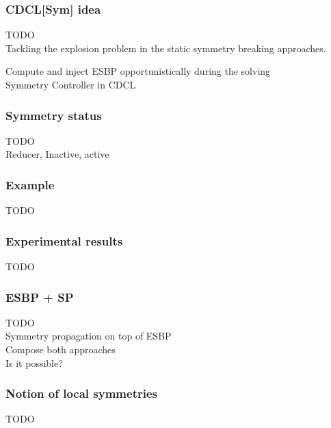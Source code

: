\documentclass{beamer}
\begin{document}
\begin{frame}
\frametitle{CDCL[Sym] idea}
TODO\\

Tackling the explosion problem in the static
symmetry breaking approaches.


Compute and inject ESBP opportunistically during the solving\\


Symmetry Controller in CDCL\\


\end{frame}

\begin{frame}
\frametitle{Symmetry status}
TODO\\

Reducer, Inactive, active\\

\end{frame}

\begin{frame}
\frametitle{Example}
TODO\\

\end{frame}

\begin{frame}
\frametitle{Experimental results}
TODO\\

\end{frame}


\begin{frame}
\frametitle{ESBP + SP}
TODO\\

Symmetry propagation on top of ESBP\\

Compose both approaches\\

Is it possible?

\end{frame}


\begin{frame}
\frametitle{Notion of local symmetries}
TODO\\

\end{frame}
\end{document}
